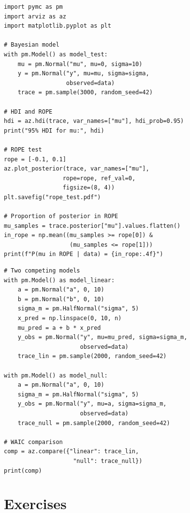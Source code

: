 \begin{codeblock}[title=\textbf{ROPE and HDI with PyMC}]
\begin{verbatim}
import pymc as pm
import arviz as az
import matplotlib.pyplot as plt

# Bayesian model
with pm.Model() as model_test:
    mu = pm.Normal("mu", mu=0, sigma=10)
    y = pm.Normal("y", mu=mu, sigma=sigma,
                  observed=data)
    trace = pm.sample(3000, random_seed=42)

# HDI and ROPE
hdi = az.hdi(trace, var_names=["mu"], hdi_prob=0.95)
print("95% HDI for mu:", hdi)

# ROPE test
rope = [-0.1, 0.1]
az.plot_posterior(trace, var_names=["mu"],
                 rope=rope, ref_val=0,
                 figsize=(8, 4))
plt.savefig("rope_test.pdf")

# Proportion of posterior in ROPE
mu_samples = trace.posterior["mu"].values.flatten()
in_rope = np.mean((mu_samples >= rope[0]) &
                   (mu_samples <= rope[1]))
print(f"P(mu in ROPE | data) = {in_rope:.4f}")
\end{verbatim}
\end{codeblock}

\begin{codeblock}[title=\textbf{Model comparison with WAIC}]
\begin{verbatim}
# Two competing models
with pm.Model() as model_linear:
    a = pm.Normal("a", 0, 10)
    b = pm.Normal("b", 0, 10)
    sigma_m = pm.HalfNormal("sigma", 5)
    x_pred = np.linspace(0, 10, n)
    mu_pred = a + b * x_pred
    y_obs = pm.Normal("y", mu=mu_pred, sigma=sigma_m,
                      observed=data)
    trace_lin = pm.sample(2000, random_seed=42)

with pm.Model() as model_null:
    a = pm.Normal("a", 0, 10)
    sigma_m = pm.HalfNormal("sigma", 5)
    y_obs = pm.Normal("y", mu=a, sigma=sigma_m,
                      observed=data)
    trace_null = pm.sample(2000, random_seed=42)

# WAIC comparison
comp = az.compare({"linear": trace_lin,
                    "null": trace_null})
print(comp)
\end{verbatim}
\end{codeblock}

\section{Exercises}

